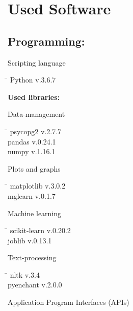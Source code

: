 \chapter*{Used Software}

\section*{Programming:}
\begin{large}Scripting language\end{large}
\begin{tabbing}
 \hspace*{5cm}  \= \kill
 Python \> v.3.6.7
\end{tabbing}
\textbf{Used libraries:}\\
\newline
\begin{large}Data-management\end{large}
\begin{tabbing}
 \hspace*{5cm}  \= \kill
 psycopg2 \> v.2.7.7 \\
 pandas \> v.0.24.1 \\
 numpy \> v.1.16.1
 \end{tabbing}
\begin{large}Plots and graphs\end{large}
\begin{tabbing}
  \hspace*{5cm}  \= \kill
  matplotlib \> v.3.0.2 \\
  mglearn \> v.0.1.7
 \end{tabbing}
\begin{large}Machine learning\end{large}
 \begin{tabbing}
  \hspace*{5cm}  \= \kill
  scikit-learn \> v.0.20.2 \\
  joblib \> v.0.13.1
 \end{tabbing}
\begin{large}Text-processing\end{large}
 \begin{tabbing}
  \hspace*{5cm}  \= \kill
   nltk \> v.3.4 \\
   pyenchant \> v.2.0.0
  \end{tabbing}
 \begin{large}Application Program Interfaces (APIs)\end{large}

